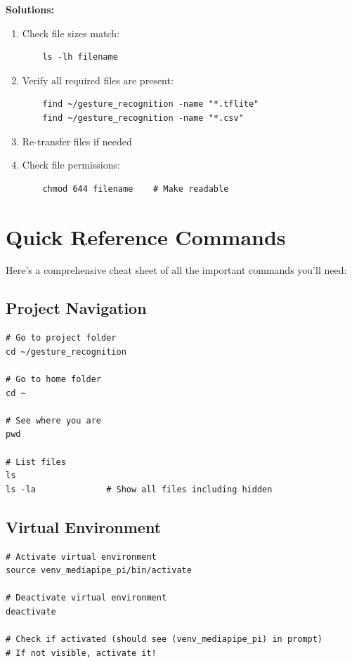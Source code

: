 \documentclass[12pt,a4paper]{article}
\begin{document}
\textbf{Solutions:}

\begin{enumerate}
    \item Check file sizes match:
    \begin{lstlisting}
    ls -lh filename
    \end{lstlisting}
    \item Verify all required files are present:
    \begin{lstlisting}
    find ~/gesture_recognition -name "*.tflite"
    find ~/gesture_recognition -name "*.csv"
    \end{lstlisting}
    \item Re-transfer files if needed
    \item Check file permissions:
    \begin{lstlisting}
    chmod 644 filename    # Make readable
    \end{lstlisting}
\end{enumerate}

\section{Quick Reference Commands}

Here's a comprehensive cheat sheet of all the important commands you'll need:

\subsection{Project Navigation}

\begin{lstlisting}
# Go to project folder
cd ~/gesture_recognition

# Go to home folder
cd ~

# See where you are
pwd

# List files
ls
ls -la              # Show all files including hidden
\end{lstlisting}

\subsection{Virtual Environment}

\begin{lstlisting}
# Activate virtual environment
source venv_mediapipe_pi/bin/activate

# Deactivate virtual environment
deactivate

# Check if activated (should see (venv_mediapipe_pi) in prompt)
# If not visible, activate it!
\end{lstlisting}
\end{document}

